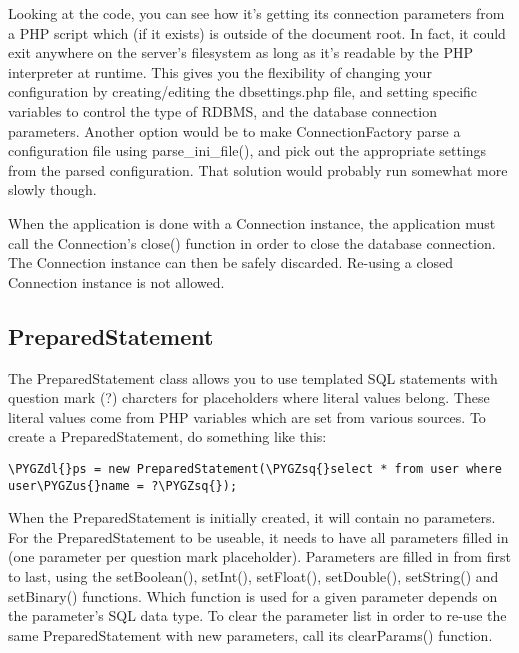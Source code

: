 \documentclass[letterpaper,10pt,english]{sphinxmanual}
\def\PYGZus{\char`\_}
\def\PYGZdl{\char`\$}
\def\PYGZsq{\char`\'}
\renewcommand\PYGZsq{\textquotesingle}
\begin{document}
Looking at the code, you can see how it's getting its connection parameters from a PHP script which
(if it exists) is outside of the document root.  In fact, it could exit anywhere on the server's
filesystem as long as it's readable by the PHP interpreter at runtime.  This gives you the
flexibility of changing your configuration by creating/editing the dbsettings.php file, and setting
specific variables to control the type of RDBMS, and the database connection parameters.  Another
option would be to make ConnectionFactory parse a configuration file using parse\_ini\_file(), and
pick out the appropriate settings from the parsed configuration.  That solution would probably run
somewhat more slowly though.

When the application is done with a Connection instance, the application must call the Connection's
close() function in order to close the database connection.  The Connection instance can then be
safely discarded.  Re-using a closed Connection instance is not allowed.


\subsection{PreparedStatement}
\label{jaxFrameworkGuide:preparedstatement}
The PreparedStatement class allows you to use templated SQL statements with question mark (?)
charcters for placeholders where literal values belong.  These literal values come from PHP
variables which are set from various sources.  To create a PreparedStatement, do something like this:

\begin{Verbatim}[commandchars=\\\{\}]
\PYGZdl{}ps = new PreparedStatement(\PYGZsq{}select * from user where user\PYGZus{}name = ?\PYGZsq{});
\end{Verbatim}

When the PreparedStatement is initially created, it will contain no parameters.  For the
PreparedStatement to be useable, it needs to have all parameters filled in (one parameter per
question mark placeholder).  Parameters are filled in from first to last, using the setBoolean(),
setInt(), setFloat(), setDouble(), setString() and setBinary() functions.  Which function is used
for a given parameter depends on the parameter's SQL data type.  To clear the parameter list in
order to re-use the same PreparedStatement with new parameters, call its clearParams() function.
\end{document}
